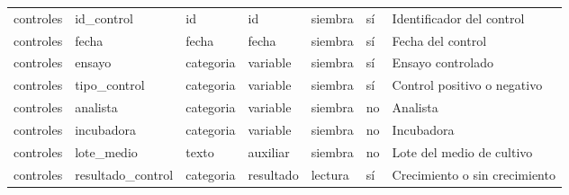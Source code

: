 \begin{tabular}{lllllll}
controles & id\_control & id & id & siembra & sí & Identificador del control \\
controles & fecha & fecha & fecha & siembra & sí & Fecha del control \\
controles & ensayo & categoria & variable & siembra & sí & Ensayo controlado \\
controles & tipo\_control & categoria & variable & siembra & sí & Control positivo o negativo \\
controles & analista & categoria & variable & siembra & no & Analista \\
controles & incubadora & categoria & variable & siembra & no & Incubadora \\
controles & lote\_medio & texto & auxiliar & siembra & no & Lote del medio de cultivo \\
controles & resultado\_control & categoria & resultado & lectura & sí & Crecimiento o sin crecimiento \\
\bottomrule
\end{tabular}
